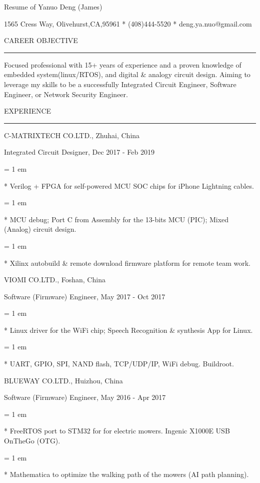 

\centerline{ \FFbg
Resume of Yanuo Deng (James)
}

\centerline{ %
1565 Cress Way, Olivehurst,CA,95961
*
(408)444-5520
*
deng.ya.nuo@gmail.com
}

{ \medbreak } { \FFbg
CAREER OBJECTIVE
}

{ \smallbreak } {\par\noindent\hrule} { \smallbreak }

    Focused professional with 15+ years of experience
and a proven knowledge of embedded system(linux/RTOS),
and digital \& analogy circuit design.
    Aiming to leverage my skills to be a successfully
Integrated Circuit Engineer,
Software Engineer,
or Network Security Engineer.

{ \medbreak } { \FFbg
EXPERIENCE
}
{ \smallbreak } {\par\noindent\hrule} { \smallbreak }

{ \medbreak } { \FFbg
C-MATRIXTECH CO.LTD., Zhuhai, China
}

{ \FFte
Integrated Circuit Designer, Dec 2017 - Feb 2019
}

{ \parindent = 1 em \item{*}
 Verilog + FPGA for self-powered MCU SOC chips for iPhone Lightning cables.
}

{ \parindent = 1 em \item{*}
 MCU debug; Port C from Assembly for the 13-bits MCU (PIC); Mixed (Analog) circuit design.
}
{ \parindent = 1 em \item{*}
 Xilinx autobuild \& remote download firmware platform for remote team work.
}

{ \medbreak } { \FFbg
VIOMI CO.LTD., Foshan, China
}

{ \FFte
Software (Firmware) Engineer, May 2017 - Oct 2017
}

{ \parindent = 1 em \item{*}
 Linux driver for the WiFi chip; Speech Recognition \& synthesis App for Linux.
 }
{ \parindent = 1 em \item{*}
 UART, GPIO, SPI, NAND flash, TCP/UDP/IP, WiFi debug. Buildroot.
 }

{ \medbreak } { \FFbg
BLUEWAY CO.LTD., Huizhou, China
}

{ \FFte
Software (Firmware) Engineer, May 2016 - Apr 2017
}
{ \parindent = 1 em \item{*}
 FreeRTOS port to STM32 for for electric mowers. Ingenic X1000E USB OnTheGo (OTG).
}
{ \parindent = 1 em \item{*}
Mathematica to optimize the walking path of the mowers (AI path planning).
}

